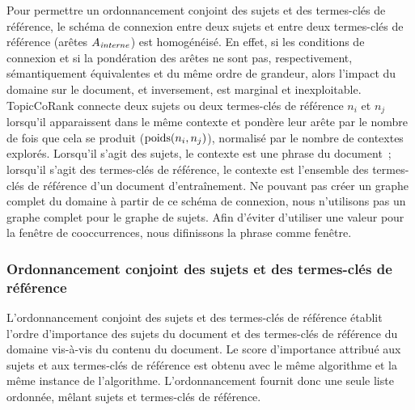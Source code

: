         Pour permettre un ordonnancement conjoint des sujets et des termes-clés
        de référence, le schéma de connexion entre deux sujets et entre deux
        termes-clés de référence (arêtes $A_\textnormal{\textit{interne}}$) est
        homogénéisé. En effet, si les conditions de connexion et si la
        pondération des arêtes ne sont pas, respectivement, sémantiquement
        équivalentes et du même ordre de grandeur, alors l'impact du domaine sur
        le document, et inversement, est marginal et inexploitable. TopicCoRank
        connecte deux sujets ou deux termes-clés de référence $n_i$ et $n_j$
        lorsqu'il apparaissent dans le même contexte et pondère leur arête par
        le nombre de fois que cela se produit ($\textnormal{poids}(n_i, n_j)$),
        normalisé par le nombre de contextes explorés. Lorsqu'il s'agit des
        sujets, le contexte est une phrase du document~; lorsqu'il s'agit des
        termes-clés de référence, le contexte est l'ensemble des termes-clés de
        référence d'un document d'entraînement. Ne pouvant pas créer un graphe
        complet du domaine à partir de ce schéma de connexion, nous n'utilisons
        pas un graphe complet pour le graphe de sujets. Afin d'éviter d'utiliser
        une valeur pour la fenêtre de cooccurrences, nous difinissons la phrase
        comme fenêtre.

      \subsubsection{Ordonnancement conjoint des sujets et des termes-clés de référence}
      \label{subsubsec:main-domain_specific_keyphrase_annotation-supervised_automatic_keyphrase_extraction-topiccorank-co_ranking}
        L'ordonnancement conjoint des sujets et des termes-clés de référence
        établit l'ordre d'importance des sujets du document et des termes-clés
        de référence du domaine vis-à-vis du contenu du document. Le score
        d'importance attribué aux sujets et aux termes-clés de référence est
        obtenu avec le même algorithme et la même instance de l'algorithme.
        L'ordonnancement fournit donc une seule liste ordonnée, mêlant sujets et
        termes-clés de référence.

